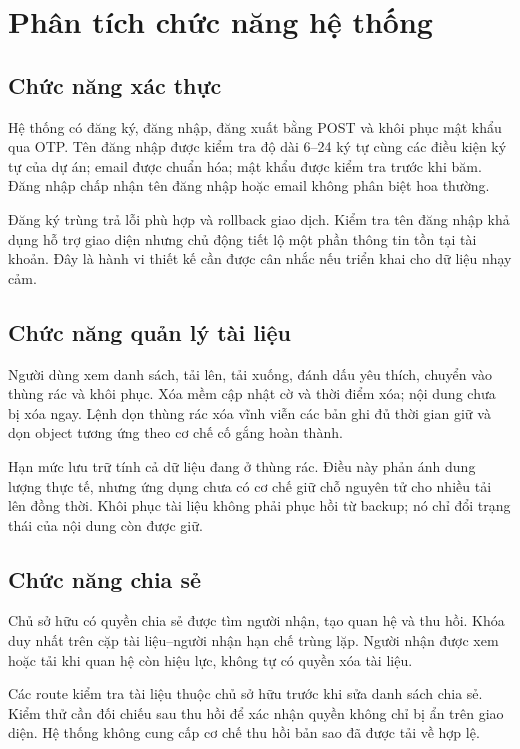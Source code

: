 \section{Phân tích chức năng hệ thống}
\subsection{Chức năng xác thực}
Hệ thống có đăng ký, đăng nhập, đăng xuất bằng POST và khôi phục mật khẩu qua OTP. Tên đăng nhập được kiểm tra độ dài 6--24 ký tự cùng các điều kiện ký tự của dự án; email được chuẩn hóa; mật khẩu được kiểm tra trước khi băm. Đăng nhập chấp nhận tên đăng nhập hoặc email không phân biệt hoa thường.

Đăng ký trùng trả lỗi phù hợp và rollback giao dịch. Kiểm tra tên đăng nhập khả dụng hỗ trợ giao diện nhưng chủ động tiết lộ một phần thông tin tồn tại tài khoản. Đây là hành vi thiết kế cần được cân nhắc nếu triển khai cho dữ liệu nhạy cảm.
\subsection{Chức năng quản lý tài liệu}
Người dùng xem danh sách, tải lên, tải xuống, đánh dấu yêu thích, chuyển vào thùng rác và khôi phục. Xóa mềm cập nhật cờ và thời điểm xóa; nội dung chưa bị xóa ngay. Lệnh dọn thùng rác xóa vĩnh viễn các bản ghi đủ thời gian giữ và dọn object tương ứng theo cơ chế cố gắng hoàn thành.

Hạn mức lưu trữ tính cả dữ liệu đang ở thùng rác. Điều này phản ánh dung lượng thực tế, nhưng ứng dụng chưa có cơ chế giữ chỗ nguyên tử cho nhiều tải lên đồng thời. Khôi phục tài liệu không phải phục hồi từ backup; nó chỉ đổi trạng thái của nội dung còn được giữ.
\subsection{Chức năng chia sẻ}
Chủ sở hữu có quyền chia sẻ được tìm người nhận, tạo quan hệ và thu hồi. Khóa duy nhất trên cặp tài liệu--người nhận hạn chế trùng lặp. Người nhận được xem hoặc tải khi quan hệ còn hiệu lực, không tự có quyền xóa tài liệu.

Các route kiểm tra tài liệu thuộc chủ sở hữu trước khi sửa danh sách chia sẻ. Kiểm thử cần đối chiếu sau thu hồi để xác nhận quyền không chỉ bị ẩn trên giao diện. Hệ thống không cung cấp cơ chế thu hồi bản sao đã được tải về hợp lệ.
